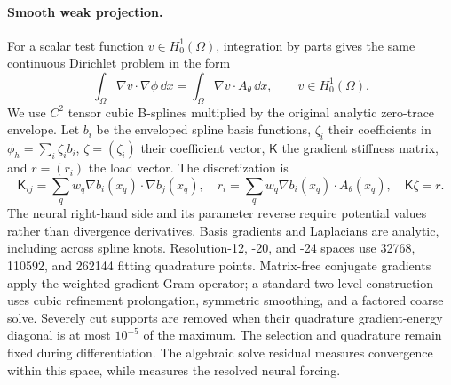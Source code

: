 \paragraph{Smooth weak projection.}
For a scalar test function $v\in H_0^1(\Omega)$, integration by parts gives the same continuous Dirichlet problem in the form
\begin{equation}
\int_\Omega\nabla v\cdot\nabla\phi\,\dd x
=\int_\Omega\nabla v\cdot A_\theta\,\dd x,
\qquad v\in H_0^1(\Omega).
\end{equation}
We use $C^2$ tensor cubic B-splines {\citep{deboor1978splines}} multiplied by the original analytic zero-trace envelope. Let $b_i$ be the enveloped spline basis functions, $\zeta_i$ their coefficients in $\phi_h=\sum_i\zeta_i b_i$, $\zeta=(\zeta_i)$ their coefficient vector, $\mathsf K$ the gradient stiffness matrix, and $r=(r_i)$ the load vector. The discretization is
\begin{equation}
\mathsf K_{ij}=\sum_qw_q\nabla b_i(x_q)\cdot\nabla b_j(x_q),\quad
r_i=\sum_qw_q\nabla b_i(x_q)\cdot A_\theta(x_q),\quad \mathsf K\zeta=r.
\end{equation}
The neural right-hand side and its parameter reverse require potential values rather than divergence derivatives. Basis gradients and Laplacians are analytic, including across spline knots. Resolution-12, -20, and -24 spaces use 32768, 110592, and 262144 fitting quadrature points. {Matrix-free conjugate gradients \citep{hestenes1952methods} apply the weighted gradient Gram operator; a standard two-level construction \citep{briggs2000multigrid} uses cubic refinement prolongation, symmetric smoothing, and a factored coarse solve.} Severely cut supports are removed when their quadrature gradient-energy diagonal is at most $10^{-5}$ of the maximum. The selection and quadrature remain fixed during differentiation. The algebraic solve residual measures convergence within this space, while  measures the resolved neural forcing.

